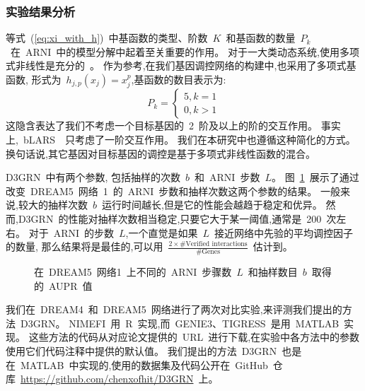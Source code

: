\subsubsection{实验结果分析}

等式~(\ref{eq:xi_with_h})~中基函数的类型、阶数~$K$~和基函数的数量~$P_k$~在~ARNI~中的模型分解中起着至关重要的作用。
对于一大类动态系统,使用多项式非线性是充分的~\cite{mangan2016inferring}。
作为参考,在我们基因调控网络的构建中,也采用了多项式基函数,
形式为~$h_{j,p}(x_j)=x_j^p$,基函数的数目表示为: 
\begin{equation}
P_k=\left\{\begin{matrix}
5,  k=1\\ 
0,  k>1
\end{matrix}\right. 
\end{equation}
这隐含表达了我们不考虑一个目标基因的~2~阶及以上的阶的交互作用。
事实上,~bLARS~\cite{singh2016blars}~只考虑了一阶交互作用。
我们在本研究中也遵循这种简化的方式。
换句话说,其它基因对目标基因的调控是基于多项式非线性函数的混合。

D3GRN~中有两个参数,
包括抽样的次数~$b$~和~ARNI~步数~$L$。
图~\ref{fig:performance_dr5}~展示了通过改变~DREAM5~网络~1~的~ARNI~步数和抽样次数这两个参数的结果。
一般来说,较大的抽样次数~$b$~运行时间越长,但是它的性能会越趋于稳定和优异。
然而,D3GRN~的性能对抽样次数相当稳定,只要它大于某一阈值,通常是~200~次左右。
对于~ARNI~的步数~$L$,一个直觉是如果~$L$~接近网络中先验的平均调控因子的数量,
那么结果将是最佳的,可以用~$\frac{2  \times \#\text{Verified interactions}}{\#\text{Genes}}$~估计到。
 
\begin{figure}[!htbp]
\centering

\caption{
在~DREAM5~网络1~上不同的~ARNI~步骤数~$L$~和抽样数目~$b$~取得的~AUPR~值}

\label{fig:performance_dr5}
\end{figure}

我们在~DREAM4~和~DREAM5~网络进行了两次对比实验,来评测我们提出的方法~D3GRN。
NIMEFI~用~R~实现,而~GENIE3、TIGRESS~是用~MATLAB~实现。
这些方法的代码从对应论文提供的~URL~进行下载,在实验中各方法中的参数使用它们代码注释中提供的默认值。
我们提出的方法~D3GRN~也是在~MATLAB~中实现的,使用的数据集及代码公开在~GitHub~仓库~\url{https://github.com/chenxofhit/D3GRN}~上。

